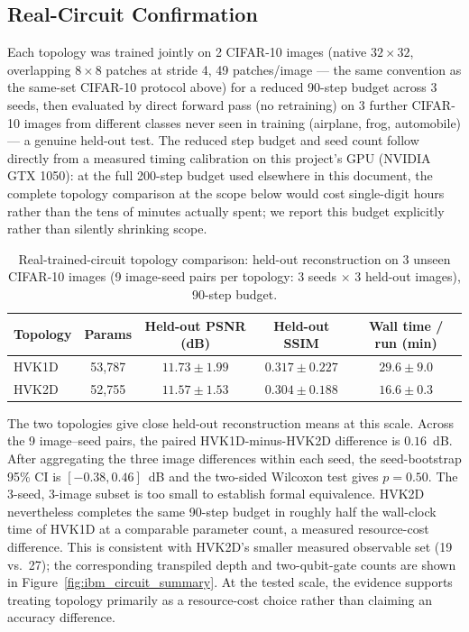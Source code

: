 \documentclass[11pt]{article}
\begin{document}
\subsection{Real-Circuit Confirmation}
\label{sec:topology_real_circuit}
Each topology was trained jointly on 2 CIFAR-10 images (native $32\times32$, overlapping $8\times8$ patches at stride 4, 49 patches/image --- the same convention as the same-set CIFAR-10 protocol above) for a reduced 90-step budget across 3 seeds, then evaluated by direct forward pass (no retraining) on 3 further CIFAR-10 images from different classes never seen in training (airplane, frog, automobile) --- a genuine held-out test. The reduced step budget and seed count follow directly from a measured timing calibration on this project's GPU (NVIDIA GTX 1050): at the full 200-step budget used elsewhere in this document, the complete topology comparison at the scope below would cost single-digit hours rather than the tens of minutes actually spent; we report this budget explicitly rather than silently shrinking scope.

\begin{table}[H]
\centering
\caption{Real-trained-circuit topology comparison: held-out reconstruction on 3 unseen CIFAR-10 images (9 image-seed pairs per topology: 3 seeds $\times$ 3 held-out images), 90-step budget.}
\label{tab:topology_real_circuit}
\scriptsize
\begin{tabular}{lcccc}
\toprule
Topology & Params & Held-out PSNR (dB) & Held-out SSIM & Wall time / run (min) \\
\midrule
HVK1D & 53{,}787 & $11.73\pm1.99$ & $0.317\pm0.227$ & $29.6\pm9.0$ \\
HVK2D & 52{,}755 & $11.57\pm1.53$ & $0.304\pm0.188$ & $16.6\pm0.3$ \\
\bottomrule
\end{tabular}
\end{table}

The two topologies give close held-out reconstruction means at this scale. Across the 9 image--seed pairs, the paired HVK1D-minus-HVK2D difference is $0.16$~dB. After aggregating the three image differences within each seed, the seed-bootstrap 95\% CI is $[-0.38,0.46]$~dB and the two-sided Wilcoxon test gives $p=0.50$. The 3-seed, 3-image subset is too small to establish formal equivalence. HVK2D nevertheless completes the same 90-step budget in roughly half the wall-clock time of HVK1D at a comparable parameter count, a measured resource-cost difference. This is consistent with HVK2D's smaller measured observable set (19 vs.\ 27); the corresponding transpiled depth and two-qubit-gate counts are shown in Figure~\ref{fig:ibm_circuit_summary}. At the tested scale, the evidence supports treating topology primarily as a resource-cost choice rather than claiming an accuracy difference.
\end{document}
